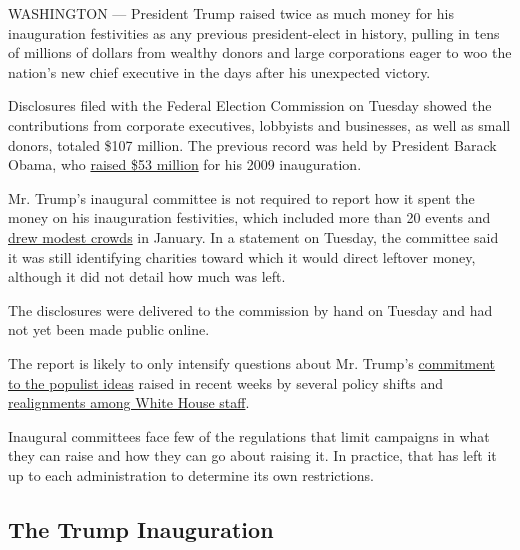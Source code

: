 WASHINGTON --- President Trump raised twice as much money for his
inauguration festivities as any previous president-elect in history,
pulling in tens of millions of dollars from wealthy donors and large
corporations eager to woo the nation's new chief executive in the days
after his unexpected victory.

Disclosures filed with the Federal Election Commission on Tuesday showed
the contributions from corporate executives, lobbyists and businesses,
as well as small donors, totaled \$107 million. The previous record was
held by President Barack Obama, who
\href{https://thecaucus.blogs.nytimes.com/2009/04/20/obamas-inaugural-fund-raising-topped-53-million/}{raised
\$53 million} for his 2009 inauguration.

Mr. Trump's inaugural committee is not required to report how it spent
the money on his inauguration festivities, which included more than 20
events and
\href{https://www.nytimes.com/interactive/2017/01/20/us/politics/trump-inauguration-crowd.html}{drew
modest crowds} in January. In a statement on Tuesday, the committee said
it was still identifying charities toward which it would direct leftover
money, although it did not detail how much was left.

The disclosures were delivered to the commission by hand on Tuesday and
had not yet been made public online.

The report is likely to only intensify questions about Mr. Trump's
\href{https://www.nytimes.com/2017/04/18/us/politics/populism-donald-trump-administration.html?hp\&action=click\&pgtype=Homepage\&clickSource=story-heading\&module=first-column-region\&region=top-news\&WT.nav=top-news}{commitment
to the populist ideas} raised in recent weeks by several policy shifts
and
\href{https://www.nytimes.com/2017/04/12/us/politics/steve-bannon-white-house-trump.html}{realignments
among White House staff}.

Inaugural committees face few of the regulations that limit campaigns in
what they can raise and how they can go about raising it. In practice,
that has left it up to each administration to determine its own
restrictions.

\href{https://www.nytimes.com/slideshow/2017/01/20/us/the-trump-inauguration.html}{}

\hypertarget{the-trump-inauguration}{%
\subsection{The Trump Inauguration}\label{the-trump-inauguration}}

